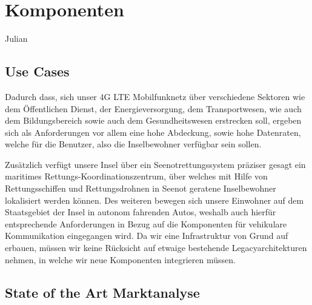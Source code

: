 
%
%
% 
% 
% 


\section{Komponenten}
\label{sec:Komponenten}
	Julian
	\subsection{Use Cases}
	\label{subsec:Use Cases}
	
	Dadurch dass, sich unser 4G LTE Mobilfunknetz über verschiedene Sektoren wie dem Öffentlichen Dienst, der Energieversorgung, dem Transportwesen, wie auch dem Bildungsbereich sowie auch dem Gesundheitswesen erstrecken soll, ergeben sich als Anforderungen vor allem eine hohe Abdeckung, sowie hohe Datenraten, welche für die Benutzer, also die Inselbewohner verfügbar sein sollen. 
	
	Zusätzlich verfügt unsere Insel über ein Seenotrettungssystem präziser gesagt ein maritimes Rettungs-Koordinationszentrum, über welches mit Hilfe von Rettungsschiffen und Rettungsdrohnen in Seenot geratene Inselbewohner lokalisiert werden können. Des weiteren bewegen sich unsere Einwohner auf dem Staatsgebiet der Insel in autonom fahrenden Autos, weshalb auch hierfür entsprechende Anforderungen in Bezug auf die Komponenten für vehikulare Kommunikation eingegangen wird. Da wir eine Infrastruktur von Grund auf erbauen, müssen wir keine Rücksicht auf etwaige bestehende Legacyarchitekturen nehmen, in welche wir neue Komponenten integrieren müssen. 
	\subsection{State of the Art Marktanalyse}
	\label{subsec:Marktanalyse}
	
